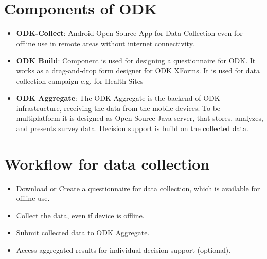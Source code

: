 \section{Components of ODK}
   \begin{itemize}
  \item \textbf{ODK-Collect}: Android Open Source App for Data Collection even for offline use in remote areas without internet connectivity.
   \item \textbf{ODK Build}: Component is used for designing a questionnaire for ODK. It works as a drag-and-drop form designer for ODK XForms. It is used for data collection campaign e.g. for Health Sites
 \item \textbf{ODK Aggregate}: The ODK Aggregate is the backend of ODK infrastructure, receiving the data from the mobile devices. To be multiplatform it is designed as Open Source Java server, that stores, analyzes, and presents survey data. Decision support is build on the collected data.   
\end{itemize}   

\section{Workflow for data collection}
   \begin{itemize}
  \item Download or Create a questionnaire for data collection, which is available for offline use.
   \item Collect the data, even if device is offline.
    \item Submit collected data to ODK Aggregate.
    \item Access aggregated results for individual decision support (optional).
\end{itemize} 




